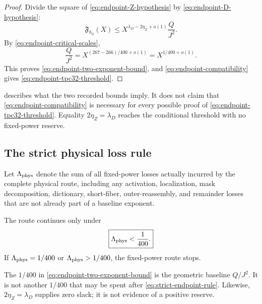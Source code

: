 \begin{proof}
Divide the square of \eqref{eq:endpoint-Z-hypothesis} by
\eqref{eq:endpoint-D-hypothesis}:
\[
 \mathfrak F_{h_0}(X)
 \le
 X^{\lambda_D-2\eta_Z+o(1)}\frac{Q}{J^2}.
\]
By \eqref{eq:endpoint-critical-scales},
\[
 \frac{Q}{J^2}
 =X^{(267-266)/400+o(1)}
 =X^{1/400+o(1)}.
\]
This proves \eqref{eq:endpoint-two-exponent-bound}, and
\eqref{eq:endpoint-compatibility} gives
\eqref{eq:endpoint-tpc32-threshold}.
\end{proof}

\begin{remark}
 describes what the two recorded
bounds imply.  It does not claim that
\eqref{eq:endpoint-compatibility} is necessary for every possible
proof of \eqref{eq:endpoint-tpc32-threshold}.  Equality
\(2\eta_Z=\lambda_D\) reaches the conditional threshold with no
fixed-power reserve.
\end{remark}

\subsection{The strict physical loss rule}

Let \(\Lambda_{\rm phys}\) denote the sum of all fixed-power losses
actually incurred by the complete physical route, including any
activation, localization, mask decomposition, dictionary, short-fiber,
outer-reassembly, and remainder losses that are not already part of a
baseline exponent.

\begin{definition}
\label{def:strict-endpoint-rule}
The route continues only under
\begin{equation}
 \boxed{\Lambda_{\rm phys}<\frac1{400}.}
 \label{eq:strict-endpoint-rule}
\end{equation}
If \(\Lambda_{\rm phys}=1/400\) or
\(\Lambda_{\rm phys}>1/400\), the fixed-power route stops.
\end{definition}

\begin{remark}
The \(1/400\) in
\eqref{eq:endpoint-two-exponent-bound} is the geometric baseline
\(Q/J^2\).  It is not another \(1/400\) that may be spent after
\eqref{eq:strict-endpoint-rule}.  Likewise,
\(2\eta_Z=\lambda_D\) supplies zero slack; it is not evidence of a
positive reserve.
\end{remark}

